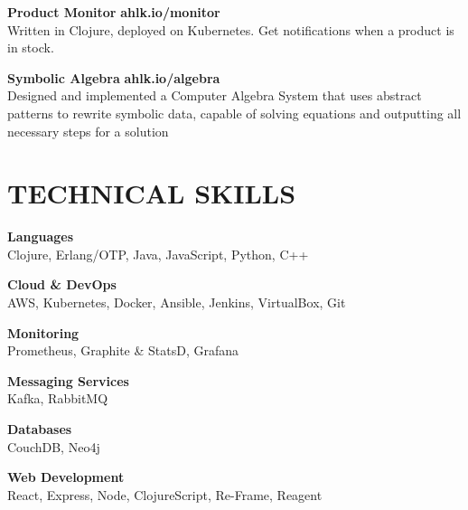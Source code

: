 \documentclass[line,margin]{res}
\begin{document}
\begin{resume}
\begin{description}
        \item \textbf{Product Monitor} \hfill \textbf{ahlk.io/monitor} \\
          Written in Clojure, deployed on Kubernetes. Get notifications
          when a product is in stock.

        \item \textbf{Symbolic Algebra} \hfill \textbf{ahlk.io/algebra} \\
          Designed and implemented a Computer Algebra System that uses
          abstract patterns to rewrite symbolic data, capable of solving
          equations and outputting all necessary steps for a solution

    \end{description}


\section{TECHNICAL SKILLS}
    \begin{description}
        \item \textbf{Languages} \hfill \\
          Clojure, Erlang/OTP, Java, JavaScript, Python, C++
        \item \textbf{Cloud \& DevOps} \hfill \\
          AWS, Kubernetes, Docker, Ansible, Jenkins, VirtualBox, Git
        \item \textbf{Monitoring} \hfill \\
          Prometheus, Graphite \& StatsD, Grafana
        \item \textbf{Messaging Services} \hfill \\
          Kafka, RabbitMQ
        \item \textbf{Databases} \hfill \\
          CouchDB, Neo4j
        \item \textbf{Web Development} \hfill \\
          React, Express, Node, ClojureScript, Re-Frame, Reagent
    \end{description}

\end{resume}
\end{document}

